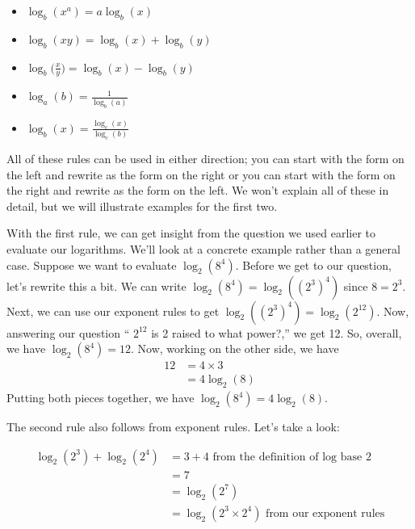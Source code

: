 \begin{itemize}
	\item $\log_b{(x^a)} = a \log_b{(x)}$
	\item $\log_b{(xy)} = \log_b{(x)} + \log_b{(y)}$
	\item $\displaystyle \log_b{\Bigg( \frac{x}{y} \Bigg)} = \log_b{(x)} - \log_b{(y)}$
	\item $\displaystyle \log_a{(b)} = \frac{1}{\log_b{(a)}}$
	\item $\displaystyle \log_b{(x)} = \frac{\log_c{(x)}}{\log_c{(b)}}$
\end{itemize}

All of these rules can be used in either direction; you can start with the form on the left and rewrite as the form on the right or you can start with the form on the right and rewrite as the form on the left. We won't explain all of these in detail, but we will illustrate examples for the first two.

With the first rule, we can get insight from the question we used earlier to evaluate our logarithms. We'll look at a concrete example rather than a general case. Suppose we want to evaluate $\log_2{(8^4)}$. Before we get to our question, let's rewrite this a bit. We can write $\log_2{(8^4)}=\log_2{((2^3)^4)}$ since $8=2^3$. Next, we can use our exponent rules to get $\log_2{((2^3)^4)} = \log_2{(2^{12})}$. Now, answering our question `` $2^{12}$ is 2 raised to what power?,'' we get 12. So, overall, we have $\log_2{(8^4)} = 12$. Now, working on the other side, we have 
\begin{equation*}
	\begin{split}
		12 &= 4 \times 3 \\
		   &= 4 \log_2{(8)}
	\end{split}
\end{equation*}
\noindent
Putting both pieces together, we have $\log_2{(8^4)} = 4\log_2{(8)}$.

The second rule also follows from exponent rules. Let's take a look:

\begin{equation*}
	\begin{split}
		\log_2{(2^3)} + \log_2{(2^4)}  & = 3 + 4 \text{ from the definition of log base 2}\\
					       & = 7 \\
					       & = \log_2{(2^7)} \\
					       & =  \log_2{(2^3\times 2^4)} \text{ from our exponent rules}
	\end{split}
\end{equation*}

